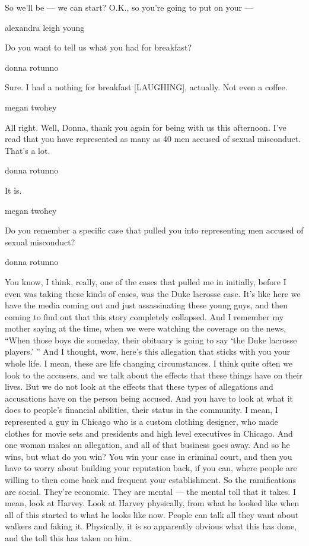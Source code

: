 So we'll be --- we can start? O.K., so you're going to put on your ---

alexandra leigh young

Do you want to tell us what you had for breakfast?

donna rotunno

Sure. I had a nothing for breakfast {[}LAUGHING{]}, actually. Not even a
coffee.

megan twohey

All right. Well, Donna, thank you again for being with us this
afternoon. I've read that you have represented as many as 40 men accused
of sexual misconduct. That's a lot.

donna rotunno

It is.

megan twohey

Do you remember a specific case that pulled you into representing men
accused of sexual misconduct?

donna rotunno

You know, I think, really, one of the cases that pulled me in initially,
before I even was taking these kinds of cases, was the Duke lacrosse
case. It's like here we have the media coming out and just assassinating
these young guys, and then coming to find out that this story completely
collapsed. And I remember my mother saying at the time, when we were
watching the coverage on the news, ``When those boys die someday, their
obituary is going to say `the Duke lacrosse players.' '' And I thought,
wow, here's this allegation that sticks with you your whole life. I
mean, these are life changing circumstances. I think quite often we look
to the accusers, and we talk about the effects that these things have on
their lives. But we do not look at the effects that these types of
allegations and accusations have on the person being accused. And you
have to look at what it does to people's financial abilities, their
status in the community. I mean, I represented a guy in Chicago who is a
custom clothing designer, who made clothes for movie sets and presidents
and high level executives in Chicago. And one woman makes an allegation,
and all of that business goes away. And so he wins, but what do you win?
You win your case in criminal court, and then you have to worry about
building your reputation back, if you can, where people are willing to
then come back and frequent your establishment. So the ramifications are
social. They're economic. They are mental --- the mental toll that it
takes. I mean, look at Harvey. Look at Harvey physically, from what he
looked like when all of this started to what he looks like now. People
can talk all they want about walkers and faking it. Physically, it is so
apparently obvious what this has done, and the toll this has taken on
him.

